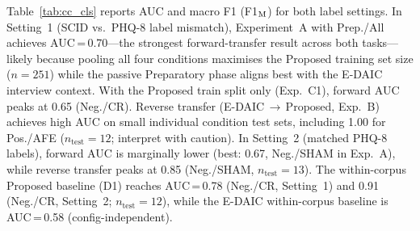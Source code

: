 \documentclass[sigconf]{acmart}
\begin{document}
Table~\ref{tab:cc_cls} reports AUC and macro F1 (F1$_{\rm M}$) for both label settings.
In Setting~1 (SCID vs.\ PHQ-8 label mismatch), Experiment~A with Prep./All achieves
AUC\,=\,0.70---the strongest forward-transfer result across both tasks---likely because
pooling all four conditions maximises the Proposed training set size ($n=251$) while
the passive Preparatory phase aligns best with the E-DAIC interview context.
With the Proposed train split only (Exp.~C1), forward AUC peaks at 0.65 (Neg./CR).
Reverse transfer (E-DAIC\,$\to$\,Proposed, Exp.~B) achieves high AUC on small individual
condition test sets, including 1.00 for Pos./AFE ($n_\text{test}=12$; interpret with caution).
In Setting~2 (matched PHQ-8 labels), forward AUC is marginally lower (best: 0.67,
Neg./SHAM in Exp.~A), while reverse transfer peaks at 0.85 (Neg./SHAM, $n_\text{test}=13$).
The within-corpus Proposed baseline (D1) reaches AUC\,=\,0.78 (Neg./CR, Setting~1)
and 0.91 (Neg./CR, Setting~2; $n_\text{test}=12$), while the E-DAIC within-corpus
baseline is AUC\,=\,0.58 (config-independent).
\end{document}
